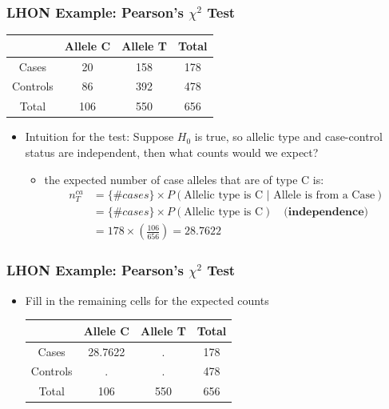 \documentclass{beamer}
\begin{document}
\begin{frame}
\frametitle{\bf LHON Example: Pearson's $\chi^2$  Test }
  \begin{center}
      \begin{tabular}{|c|cc|c|}
        \hline
         & Allele C  &  Allele T& Total\\
\hline
Cases & 20 & 158 & 178   \\
Controls &86& 392 &478 \\
\hline
Total& 106&550& 656 \\
 \hline
      \end{tabular}
    \end{center}
\begin{itemize}
\item Intuition for the test: Suppose $H_0$ is true, so allelic type and case-control status are independent, then what counts would we expect?
\begin{itemize}
\item the expected number of case alleles that are of type C is:
\begin{align*}
n^{ca}_T &= \{\#cases\} \times P(\mbox{Allelic type is C  \(|\)  Allele is from a Case}) \\
&=  \{\#cases\}  \times P(\mbox{Allelic type is C}) \quad \textbf{(independence)}\\
&=178\times \left(\frac{106}{656}\right)=28.7622
\end{align*}
\end{itemize}
\end{itemize}
\end{frame}


\begin{frame}
\frametitle{\bf LHON Example: Pearson's $\chi^2$ Test }
 \begin{itemize}
\item Fill in the remaining cells for the expected counts
  \begin{center}
      \begin{tabular}{|c|cc|c|}
        \hline
         & Allele C  &  Allele T& Total\\
\hline
Cases & 28.7622 & . & 178   \\
Controls &.& . &478 \\
\hline
Total& 106&550& 656 \\
 \hline
      \end{tabular}
    \end{center}
 \end{itemize}
\end{frame}
\end{document}
